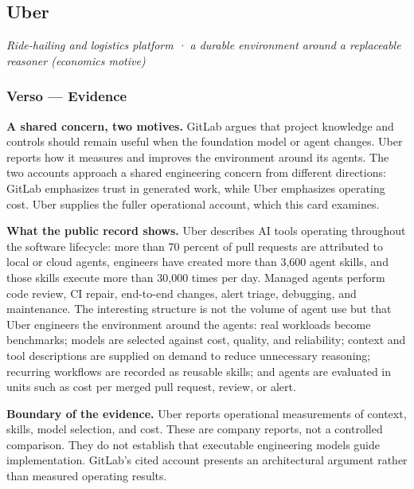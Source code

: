 
\subsection{Uber}\label{heading:uber}

\emph{Ride-hailing and logistics platform · a durable environment around a replaceable reasoner (economics motive)}

\subsubsection{Verso --- Evidence}\label{heading:verso-evidence}

\textbf{A shared concern, two motives.} GitLab argues that project knowledge and controls should remain useful when the foundation model or agent changes.\citep{staples2026abundant} Uber reports how it measures and improves the environment around its agents. The two accounts approach a shared engineering concern from different directions: GitLab emphasizes trust in generated work, while Uber emphasizes operating cost. Uber supplies the fuller operational account, which this card examines.

\textbf{What the public record shows.} Uber describes AI tools operating throughout the software lifecycle: more than 70 percent of pull requests are attributed to local or cloud agents, engineers have created more than 3,600 agent skills, and those skills execute more than 30,000 times per day.\citep{medisetty2026factory} Managed agents perform code review, CI repair, end-to-end changes, alert triage, debugging, and maintenance. The interesting structure is not the volume of agent use but that Uber engineers the environment around the agents: real workloads become benchmarks; models are selected against cost, quality, and reliability; context and tool descriptions are supplied on demand to reduce unnecessary reasoning; recurring workflows are recorded as reusable skills; and agents are evaluated in units such as cost per merged pull request, review, or alert.

\textbf{Boundary of the evidence.} Uber reports operational measurements of context, skills, model selection, and cost. These are company reports, not a controlled comparison. They do not establish that executable engineering models guide implementation. GitLab's cited account presents an architectural argument rather than measured operating results.

